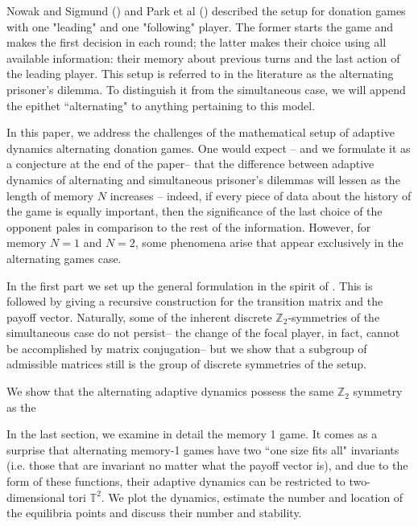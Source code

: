 \documentclass{article}
\theoremstyle{definition}
\numberwithin{equation}{section}
\begin{document}
Nowak  and Sigmund (\cite{nowak1994alternating}) and Park et al (\cite{park2022cooperation}) described the setup for donation games with one "leading" and one "following" player. The former starts the game and makes the first decision in each round; the latter  makes their choice using all available information: their memory about previous turns and the last action of the leading player. This setup is referred to in the literature as the alternating prisoner's dilemma. To distinguish it from the simultaneous case, we will append the epithet ``alternating" to anything pertaining to this model.  

In this paper, we address the challenges of the mathematical setup of adaptive dynamics alternating donation games. One would expect -- and we formulate it as a conjecture at the end of the paper-- that the difference between adaptive  dynamics of alternating and simultaneous prisoner's dilemmas will lessen as the length of memory $N$ increases -- indeed, if every piece of data about the history of the game is equally important, then the significance  of the last choice of the opponent pales in comparison to the rest of the information. However, for memory $N=1$ and $N=2$, some phenomena arise that appear exclusively in the alternating games case. 

 In the first part we set up the general formulation in the spirit of \cite{balabanova2024adaptive}. This is followed by giving a recursive construction for the transition matrix and the payoff vector. Naturally, some of the inherent discrete $\mathbb{Z}_2$-symmetries of the simultaneous case do not persist-- the change of the focal player, in fact, cannot be accomplished by matrix conjugation-- but we show that a subgroup of admissible matrices still is the group of discrete symmetries of the setup. 

We show that the alternating  adaptive dynamics possess the same  $\mathbb{Z}_2$ symmetry as the 

 
In the last section, we examine in detail the  memory 1 game. It comes as a surprise that alternating memory-1 games have two ``one size fits all" invariants (i.e. those that are invariant no matter what the payoff vector is), and due to the form of these functions, their adaptive dynamics can be restricted to two-dimensional tori $\mathbb{T}^2$. We plot the dynamics, estimate the number and location of the equilibria points and discuss their number and stability. 
\end{document}
